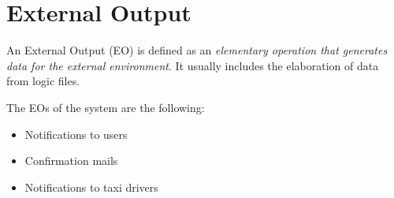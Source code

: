 \section{External Output}
An External Output (EO) is defined as an \emph{elementary operation that generates data for the external environment}. It usually includes the elaboration of data from logic files.

The EOs of the system are the following:
\begin{itemize}
	\item Notifications to users
	\item Confirmation mails
	\item Notifications to taxi drivers
\end{itemize}

